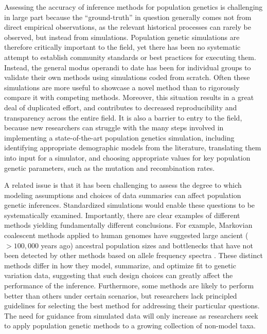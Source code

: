 \documentclass[12pt,halfline,a4paper]{ouparticle}
\begin{document}
Assessing the accuracy of inference methods for population genetics is
challenging in large part because the ``ground-truth'' in question
generally comes not from direct empirical observations, as the relevant
historical processes can rarely be observed, but instead from simulations.
Population genetic simulations are therefore critically important to the
field, yet there has been no systematic attempt to establish community
standards or best practices for executing them.
Instead, the general modus
operandi to date has been for individual groups to validate their own
methods using simulations coded from scratch.
Often these simulations are more useful to showcase a novel method than to
rigorously compare it with competing methods.
Moreover, this situation results in a great deal of duplicated effort,
and contributes to decreased reproducibility and transparency across the entire field.
It is also a barrier to entry to the field, because new researchers can
struggle with the many steps involved
in implementing a state-of-the-art population genetics simulation,
including identifying appropriate demographic models from the literature,
translating them into input for a simulator, and choosing appropriate values for key population genetic parameters,
such as the mutation and recombination rates.

A related issue is that it has been challenging to assess the degree to which modeling assumptions
and choices of data summaries can affect population genetic inferences.  
Standardized simulations would enable these questions to be systematically examined.
Importantly, there are clear examples of different methods yielding fundamentally
different conclusions. For example, Markovian coalescent methods applied to human genomes have
suggested large ancient ($>100,000$ years ago) ancestral population sizes and
bottlenecks that have not been detected by other methods based on allele frequency spectra
\citep[see][]{beichman2017comparison}.
These distinct methods differ in how they model, summarize, and optimize fit to
genetic variation data, suggesting that such design choices can greatly affect the
performance of the inference. Furthermore, some methods are likely to
perform better than others under certain scenarios, but
researchers lack principled guidelines for selecting the best method for addressing
their particular questions. The need for 
guidance from simulated data will only increase as researchers
seek to apply population genetic methods to a growing collection of non-model taxa.
\end{document}
